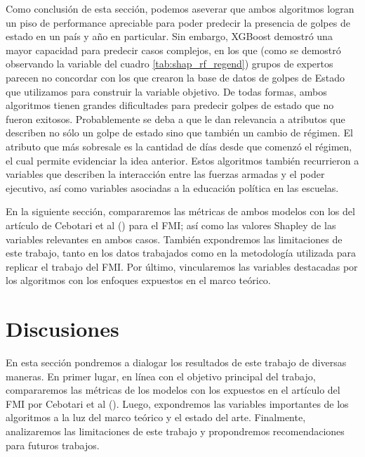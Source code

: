 \documentclass{article}
\begin{document}
Como conclusión de esta sección, podemos aseverar que ambos algoritmos logran un piso de performance 
apreciable para poder predecir la presencia de golpes de estado en un país y año en particular. Sin 
embargo, XGBoost demostró una mayor capacidad para predecir casos complejos, en los que (como se 
demostró observando la variable del cuadro \ref{tab:shap_rf_regend}) grupos de expertos parecen no 
concordar con los que crearon la base de datos de golpes de Estado que utilizamos para construir la 
variable objetivo. De todas formas, ambos algoritmos tienen grandes dificultades para predecir golpes 
de estado que no fueron exitosos. Probablemente se deba a que le dan relevancia a atributos que 
describen no sólo un golpe de estado sino que también un cambio de régimen. El atributo que más 
sobresale es la cantidad de días desde que comenzó el régimen, el cual permite evidenciar la idea 
anterior. Estos algoritmos también recurrieron a variables que describen la interacción entre las 
fuerzas armadas y el poder ejecutivo, así como variables asociadas a la educación política en las 
escuelas. 

En la siguiente sección, compararemos las métricas de ambos modelos con los del artículo
de Cebotari et al (\citeyear{Ceb24}) para el FMI; así como las valores Shapley de las variables 
relevantes en ambos casos. También expondremos las limitaciones de este trabajo, tanto en los
datos trabajados como en la metodología utilizada para replicar el trabajo del FMI. Por último,
vincularemos las variables destacadas por los algoritmos con los enfoques expuestos en el marco
teórico.



\section{Discusiones}

En esta sección pondremos a dialogar los resultados de este trabajo de diversas maneras. En primer
lugar, en línea con el objetivo principal del trabajo, compararemos las métricas de los modelos
con los expuestos en el artículo del FMI por Cebotari et al (\citeyear{Ceb24}). Luego, expondremos
las variables importantes de los algoritmos a la luz del marco teórico y el estado del arte. Finalmente,
analizaremos las limitaciones de este trabajo y propondremos recomendaciones para futuros trabajos.
\end{document}
